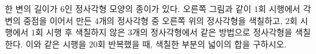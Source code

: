 \noindent\begin{minipage}[t]{0.58\linewidth}\vspace{0pt}\raggedright 한 변의 길이가 $6$인 정사각형 모양의 종이가 있다. 오른쪽 그림과 같이 $1$회 시행에서 각 변의 중점을 이어서 만든 $4$개의 정사각형 중 오른쪽 위의 정사각형을 색칠하고, $2$회 시행에서 $1$회 시행 후 색칠하지 않은 $3$개의 정사각형에서 같은 방법으로 정사각형을 색칠한다. 이와 같은 시행을 $20$회 반복했을 때, 색칠한 부분의 넓이의 합을 구하시오.\end{minipage}\hfill\begin{minipage}[t]{0.4\linewidth}\vspace{0pt}\centering \resizebox{\ifdim\width>\linewidth\linewidth\else\width\fi}{!}{}\end{minipage}\par
